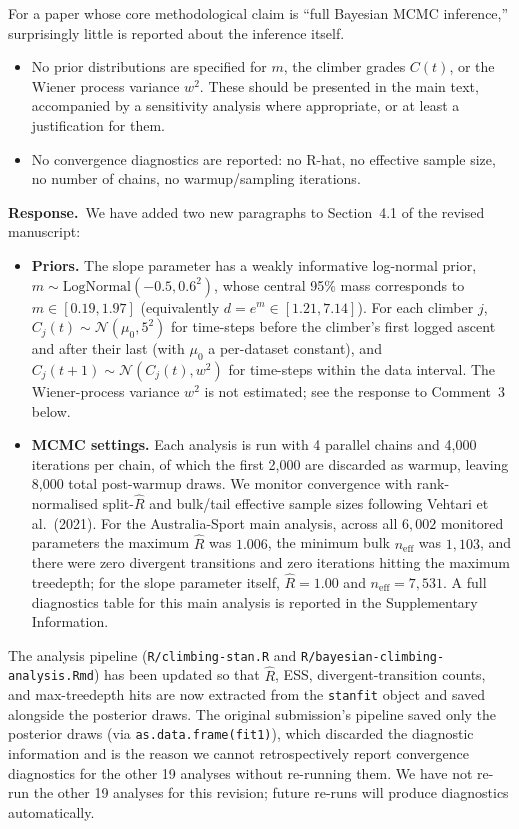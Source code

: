 \documentclass[11pt]{article}
\newenvironment{review}{\begingroup\color{revcolor}\itshape\par\noindent}{\par\endgroup}
\newcommand{\response}{\par\noindent\textbf{Response.}\ }
\begin{document}
\begin{review}
For a paper whose core methodological claim is ``full Bayesian MCMC inference,'' surprisingly little is reported about the inference itself.
\begin{itemize}
\item No prior distributions are specified for $m$, the climber grades $C(t)$, or the Wiener process variance $w^2$. These should be presented in the main text, accompanied by a sensitivity analysis where appropriate, or at least a justification for them.
\item No convergence diagnostics are reported: no R-hat, no effective sample size, no number of chains, no warmup/sampling iterations.
\end{itemize}
\end{review}
\response We have added two new paragraphs to Section~4.1 of the revised manuscript:
\begin{itemize}
\item \textbf{Priors.} The slope parameter has a weakly informative log-normal prior, $m \sim \mathrm{LogNormal}(-0.5, 0.6^2)$, whose central 95\% mass corresponds to $m \in [0.19, 1.97]$ (equivalently $d = e^m \in [1.21, 7.14]$). For each climber $j$, $C_j(t) \sim \mathcal{N}(\mu_0, 5^2)$ for time-steps before the climber's first logged ascent and after their last (with $\mu_0$ a per-dataset constant), and $C_j(t+1) \sim \mathcal{N}(C_j(t), w^2)$ for time-steps within the data interval. The Wiener-process variance $w^2$ is not estimated; see the response to Comment~3 below.
\item \textbf{MCMC settings.} Each analysis is run with 4 parallel chains and 4{,}000 iterations per chain, of which the first 2{,}000 are discarded as warmup, leaving 8{,}000 total post-warmup draws. We monitor convergence with rank-normalised split-$\hat{R}$ and bulk/tail effective sample sizes following Vehtari et al.\ (2021). For the Australia-Sport main analysis, across all $6{,}002$ monitored parameters the maximum $\hat{R}$ was $1.006$, the minimum bulk $n_{\mathrm{eff}}$ was $1{,}103$, and there were zero divergent transitions and zero iterations hitting the maximum treedepth; for the slope parameter itself, $\hat{R} = 1.00$ and $n_{\mathrm{eff}} = 7{,}531$. A full diagnostics table for this main analysis is reported in the Supplementary Information.
\end{itemize}
The analysis pipeline (\texttt{R/climbing-stan.R} and \texttt{R/bayesian-climbing-analysis.Rmd}) has been updated so that $\hat{R}$, ESS, divergent-transition counts, and max-treedepth hits are now extracted from the \texttt{stanfit} object and saved alongside the posterior draws. The original submission's pipeline saved only the posterior draws (via \texttt{as.data.frame(fit1)}), which discarded the diagnostic information and is the reason we cannot retrospectively report convergence diagnostics for the other 19 analyses without re-running them. We have not re-run the other 19 analyses for this revision; future re-runs will produce diagnostics automatically.
\end{document}
